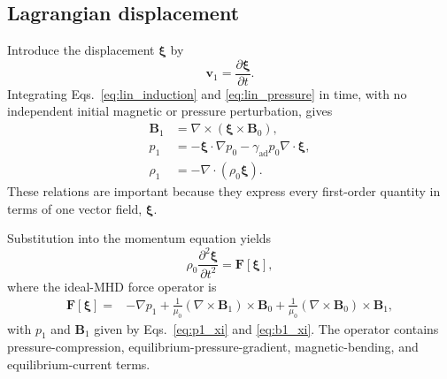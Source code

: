\subsection{Lagrangian displacement}
Introduce the displacement $\boldsymbol\xi$ by
\begin{equation}
\mathbf v_1=\frac{\partial\boldsymbol\xi}{\partial t}.
\label{eq:v_xi}
\end{equation}
Integrating Eqs.~\eqref{eq:lin_induction} and \eqref{eq:lin_pressure} in time, with no independent initial magnetic or pressure perturbation, gives
\begin{align}
\mathbf B_1&=\nabla\times(\boldsymbol\xi\times\mathbf B_0),
\label{eq:b1_xi}\\
p_1&=-\boldsymbol\xi\cdot\nabla p_0-\gamma_{\mathrm{ad}}p_0\nabla\cdot\boldsymbol\xi,
\label{eq:p1_xi}\\
\rho_1&=-\nabla\cdot(\rho_0\boldsymbol\xi).
\label{eq:rho1_xi}
\end{align}
These relations are important because they express every first-order quantity in terms of one vector field, $\boldsymbol\xi$.

Substitution into the momentum equation yields
\begin{equation}
\rho_0\frac{\partial^2\boldsymbol\xi}{\partial t^2}=\mathbf F[\boldsymbol\xi],
\label{eq:linear_force_operator}
\end{equation}
where the ideal-MHD force operator is
\begin{align}
\mathbf F[\boldsymbol\xi]
={}&-\nabla p_1
+\frac{1}{\mu_0}\left(\nabla\times\mathbf B_1\right)\times\mathbf B_0
+\frac{1}{\mu_0}\left(\nabla\times\mathbf B_0\right)\times\mathbf B_1,
\label{eq:force_operator_explicit}
\end{align}
with $p_1$ and $\mathbf B_1$ given by Eqs.~\eqref{eq:p1_xi} and \eqref{eq:b1_xi}. The operator contains pressure-compression, equilibrium-pressure-gradient, magnetic-bending, and equilibrium-current terms.

